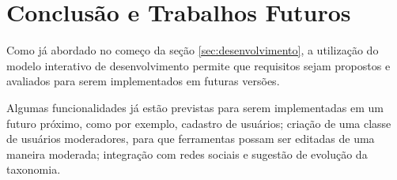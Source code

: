 \chapter[Conclusão e Trabalhos Futuros]{Conclusão e Trabalhos Futuros}
\label{cap:cap5}
Como já abordado no começo da seção \ref{sec:desenvolvimento}, a utilização do modelo interativo de desenvolvimento permite que requisitos sejam propostos e avaliados para serem
implementados em futuras versões.

\par
Algumas funcionalidades já estão previstas para serem implementadas em um futuro próximo, como por exemplo, cadastro de usuários; criação de uma classe de usuários moderadores,
para que ferramentas possam ser editadas de uma maneira moderada; integração com redes sociais e sugestão de evolução da taxonomia. 